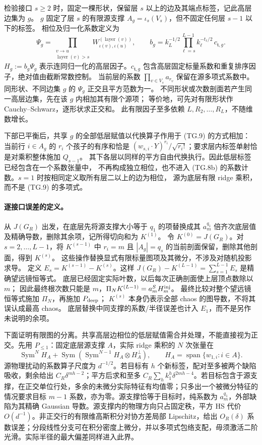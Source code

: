 \documentclass[a4paper]{tufte-handout}
\begin{document}
\begin{fullwidth}
检验接口 $s\ge2$ 时，固定一棵形状，保留层 $s$ 以上的边及其端点标签，记此高层边集为 $g$。
$g$ 固定了层 $s$ 的有限源支撑 $A_g=\iota_s(V_s)$，但不固定任何层 $s-1$ 以下的标签。
相位及归一化系数定义为
\[
 \Psi_g=\prod_{\substack{v\to u\\\operatorname{layer}(v)>s}}
 W^{(\operatorname{layer}(v))}_{\iota(v),\iota(u)},\qquad
 b_g=k_L^{-1/2}\prod_{\ell=s}^{L-1}k_\ell^{-t_\ell/2}\,c_{\mathfrak t,g}.
 \tag{TG.8b}
\]
$H_g:=b_g\Psi_g$ 表示连同归一化的高层因子。$c_{\mathfrak t,g}$ 包含高层固定标量系数和重复排序因子，绝对值由截断常数控制。
当前层的系数 $\prod_{v\in V_s}a_{r_v}$ 保留在源多项式系数中。
同形状、不同边集 $g$ 的 $\Psi_g$ 正交且平方范数为一。
不同形状或次数剖面若产生同一高层边集，先在该 $g$ 内相加其有限个源项；
等价地，可先对有限形状作 Cauchy--Schwarz，逐形状求正交和。
此有限因子至多依赖 $L,R_2,\ldots,R_L$，不随维数增长。

下部已平衡后，共享 $g$ 的全部低层赋值以代换算子作用于 (TG.9) 的方式相加：
当前行 $i\in A_g$ 的 $r_i$ 个孩子的有序和恰是
$(w_{s,i}\cdot Y)^{r_i}/\sqrt{r_i!}$；要求层内标签单射恰是对乘积整体施加 $Q_{s-1}$。
其下各层以同样的平方自由代换执行。因此低层标签已经包含在一个系数张量中，
不再构成独立相位，也不进入 (TG.8b) 的系数计数。$s=1$ 时按相同定义取所有层二以上的边为相位，
源为底层有限 ridge 乘积，而不是 (TG.9) 的多项式。

\paragraph{逐接口误差的定义。}
从 $J(G_R)$ 出发，在底层先将源支撑大小等于 $q_1$ 的项替换成其
$a_m^{q_1}$ 倍齐次底层值及精确导数，删除其余项，记所得切向和为 $K^{(1)}$。
令 $K^{(0)}=J(G_R)$。对 $s=2,\ldots,L-1$，将 $K^{(s-1)}$ 中
$r_i=m$ 且 $|A_g|=q_s$ 的当前剖面保留，删除其他剖面，得到 $K^{(s)}$。
这些操作替换显式有限标量图项及其微分，不涉及对随机投影求导。
定义 $E_s=K^{(s-1)}-K^{(s)}$。这样
$J(G_R)-K^{(L-1)}=\sum_{s=1}^{L-1}E_s$ 是精确望远镜恒等式。
底层已经固定实际叶数，以后每次正确剖面使上层顶点数除以 $m$；
因此最终根次数只能是 $m$，$\Pi_NK^{(L-1)}=a_m^S H_m^{\rm inj}$。
最终比较对整个望远镜恒等式施加 $\Pi_N$，再施加 $P_{\rm deep}$；
$K^{(s)}$ 本身仍表示全部 chaos 的图导数，不将其误认成最高 chaos。
底层替换中同支撑的系数/半径误差也计入 $E_1$，而不是另作未说明的余项。

下面证明有限图的分离。共享高层边相位的低层赋值需合并处理，不能直接视为正交。先用 $P_{\le1}$：固定底层源支撑 $A$，实际 ridge 乘积的 $N$ 次张量在
\[
 \operatorname{Sym}^N H_A+\operatorname{Sym}(\operatorname{Sym}^{N-1}H_A\otimes H_A^\perp),
 \qquad H_A=\operatorname{span}\{w_{1,i}:i\in A\}.
\]
源物理扰动的系数算子尺度为 $d^{-1/2}$。若目标有 $h$ 个新标签，配对至多被两个缺陷吸收，剩余给出 $C_R\delta^{mh-2}$；平方后求和至多 $C_R\sum_hk_1^h\delta^{2mh-4}$。若目标包含于源支撑，在正交单位行处，多余的未微分实际特征有均值零；只多出一个被微分特征的情况要求目标 $m-1$ 系数，亦为零。源支撑恰等于目标时，纯系数为 $a_m^{q_1}$，外部缺陷为其精确 Gaussian 导数。源支撑内的物理方向只占固定秩，平方 HS 代价 $O(d^{-1})$。非正交行的有限维高斯积分对协方差局部 Lipschitz，给出 $O_R(\delta)$ 系数误差；分段线性分支可在积分密度上微分，并以多项式包络支配，毋须激活二阶光滑。实际半径的最大偏差同样进入此界。


\end{fullwidth}
\end{document}
